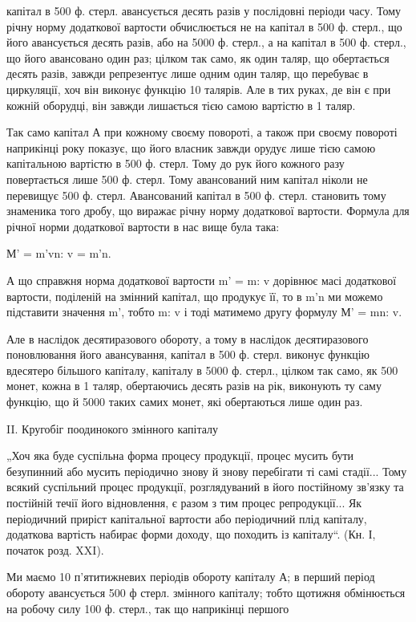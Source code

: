 \parcont{}  %
капітал в 500 ф. стерл. авансується десять разів у послідовні періоди часу.
Тому річну норму додаткової вартости обчислюється не на капітал в 500 ф.
стерл., що його авансується десять разів, або на 5000 ф. стерл., а на капітал
в 500 ф. стерл., що його авансовано один раз; цілком так само,
як один таляр, що обертається десять разів, завжди репрезентує лише
одним один таляр, що перебуває в циркуляції, хоч він виконує функцію
10 талярів. Але в тих руках, де він є при кожній оборудці, він завжди
лишається тією самою вартістю в 1 таляр.

Так само капітал А при кожному своєму повороті, а також при своєму
повороті наприкінці року показує, що його власник завжди орудує
лише тією самою капітальною вартістю в 500 ф. стерл. Тому до рук його
кожного разу повертається лише 500 ф. стерл. Тому авансований ним капітал
ніколи не перевищує 500 ф. стерл. Авансований капітал в 500 ф. стерл.
становить тому знаменика того дробу, що виражає річну норму додаткової
вартости. Формула для річної норми додаткової вартости в нас
вище була така:

М' = m'vn: v = m'n.

А що справжня норма додаткової вартости m' = m: v дорівнює масі додаткової
вартости, поділеній на змінний капітал, що продукує її, то в
m'n ми можемо підставити значення m', тобто m: v і тоді матимемо другу
формулу М' = mn: v.

Але в наслідок десятиразового обороту, а тому в наслідок десятиразового
поновлювання його авансування, капітал в 500 ф. стерл. виконує
функцію вдесятеро більшого капіталу, капіталу в 5000 ф. стерл., цілком так
само, як 500 монет, кожна в 1 таляр, обертаючись десять разів на рік,
виконують ту саму функцію, що й 5000 таких самих монет, які обертаються
лише один раз.

II. Кругобіг поодинокого змінного капіталу

„Хоч яка буде суспільна форма процесу продукції, процес мусить
бути безупинний або мусить періодично знову й знову перебігати ті самі
стадії... Тому всякий суспільний процес продукції, розглядуваний в
його постійному зв’язку та постійній течії його відновлення, є разом з
тим процес репродукції... Як періодичний приріст капітальної вартости
або періодичний плід капіталу, додаткова вартість набирає форми доходу,
що походить із капіталу“. (Кн. І, початок розд. XXI).

Ми маємо 10 п’ятитижневих періодів обороту капіталу А; в перший
період обороту авансується 500 ф стерл. змінного капіталу; тобто щотижня
обмінюється на робочу силу 100 ф. стерл., так що наприкінці першого
\parbreak{}  %
